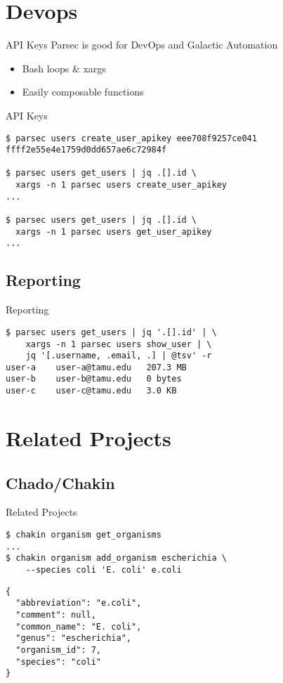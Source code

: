 \documentclass[12pt]{phage3slides} %
\begin{document}
\section{Devops}
\begin{frame}[fragile]{API Keys}
Parsec is good for DevOps and Galactic Automation
\begin{itemize}
	\item Bash loops \& xargs
	\item Easily composable functions
\end{itemize}
\end{frame}


\begin{frame}[fragile,t]{API Keys}
\begin{verbatim}
$ parsec users create_user_apikey eee708f9257ce041
ffff2e55e4e1759d0dd657ae6c72984f

$ parsec users get_users | jq .[].id \
  xargs -n 1 parsec users create_user_apikey
...

$ parsec users get_users | jq .[].id \
  xargs -n 1 parsec users get_user_apikey
...
\end{verbatim}
\end{frame}


\subsection{Reporting}
\begin{frame}[fragile,t]{Reporting}
\begin{verbatim}
$ parsec users get_users | jq '.[].id' | \
    xargs -n 1 parsec users show_user | \
    jq '[.username, .email, .] | @tsv' -r
user-a    user-a@tamu.edu   207.3 MB
user-b    user-b@tamu.edu   0 bytes
user-c    user-c@tamu.edu   3.0 KB
\end{verbatim}
\end{frame}



\section{Related Projects}
\subsection{Chado/Chakin}
\begin{frame}[fragile,t]{Related Projects}
\begin{verbatim}
$ chakin organism get_organisms
...
$ chakin organism add_organism escherichia \
    --species coli 'E. coli' e.coli
\end{verbatim}
\begin{verbatim}
{
  "abbreviation": "e.coli",
  "comment": null,
  "common_name": "E. coli",
  "genus": "escherichia",
  "organism_id": 7,
  "species": "coli"
}
\end{verbatim}
\end{frame}
\end{document}
